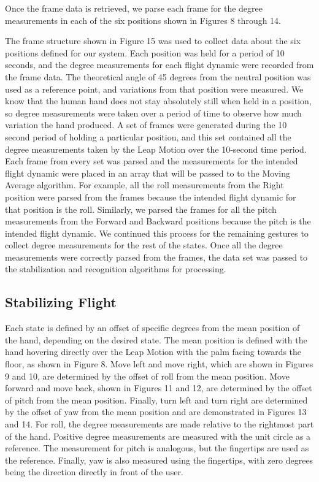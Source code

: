 \documentclass[letterpaper,english, 12pt]{article}
\begin{document}
Once the frame data is retrieved, we parse each frame for the degree measurements in each of the six positions shown in Figures 8 through 14.

The frame structure shown in Figure 15 was used to collect data about the six positions defined for our system. Each position was held for a period of 10 seconds, and the degree measurements for each flight dynamic were recorded from the frame data. The theoretical angle of 45 degrees from the neutral position was used as a reference point, and variations from that position were measured. We know that the human hand does not stay absolutely still when held in a position, so degree measurements were taken over a period of time to observe how much variation the hand produced. A set of frames were generated during the 10 second period of holding a particular position, and this set contained all the degree measurements taken by the Leap Motion over the 10-second time period. Each frame from every set was parsed and the measurements for the intended flight dynamic were placed in an array that will be passed to to the Moving Average algorithm. For example,  all the roll measurements from the Right position were parsed from the frames because the intended flight dynamic for that position is the roll. Similarly, we parsed the frames for all the pitch measurements from the Forward and Backward positions because the pitch is the intended flight dynamic. We continued this process for the remaining gestures to collect degree measurements for the rest of the states. Once all the degree measurements were correctly parsed from the frames, the data set was passed to the stabilization and recognition algorithms for processing.


\subsection*{Stabilizing Flight}

Each state is defined by an offset of specific degrees from the mean position of the hand, depending on the desired state. The mean position is defined with the hand hovering directly over the Leap Motion with the palm facing towards the floor, as shown in Figure 8. Move left and move right, which are shown in Figures 9 and 10, are determined by the offset of roll from the mean position. Move forward and move back, shown in Figures 11 and 12,  are determined by the offset of pitch from the mean position. Finally, turn left and turn right are determined by the offset of yaw from the mean position and are demonstrated in Figures 13 and 14. For roll, the degree measurements are made relative to the rightmost part of the hand. Positive degree measurements are measured with the unit circle as a reference. The measurement for pitch is analogous, but the fingertips are used as the reference. Finally, yaw is also measured using the fingertips, with zero degrees being the direction directly in front of the user.
\end{document}
